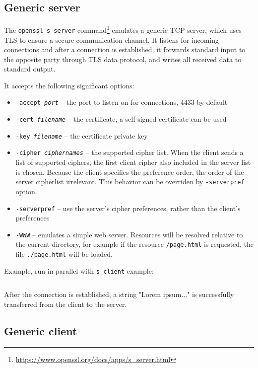 \inputminted{text}{code/openssl-speed-example.txt}


\subsection{Generic server}

The \texttt{openssl s\_server} command\footnote{\url{https://www.openssl.org/docs/apps/s\_server.html}} emulates a generic TCP server, which uses TLS to ensure a secure communication channel. It listens for incoming connections and after a connection is established, it forwards standard input to the opposite party through TLS data protocol, and writes all received data to standard output.

It accepts the following significant options:

\begin{itemize}
  \item \texttt{-accept \textit{port}} -- the port to listen on for connections, 4433 by default
  \item \texttt{-cert \textit{filename}} -- the certificate, a self-signed certificate can be used
  \item \texttt{-key \textit{filename}} -- the certificate private key
  \item \texttt{-cipher \textit{ciphernames}} -- the supported cipher list. When the client sends a list of supported ciphers, the first client cipher also included in the server list is chosen. Because the client specifies the preference order, the order of the server cipherlist irrelevant. This behavior can be overriden by \texttt{-serverpref} option.
  \item \texttt{-serverpref} -- use the server's cipher preferences, rather than the client's preferences
  \item \texttt{-WWW} -- emulates a simple web server. Resources will be resolved relative to the current directory, for example if the resource \texttt{/page.html} is requested, the file \texttt{./page.html} will be loaded.
\end{itemize}

Example, run in parallel with \texttt{s\_client} example:

\inputminted{text}{code/openssl-s_server-example.txt}

After the connection is established, a string "Lorem ipsum..." is successfully transferred from the client to the server.


\subsection{Generic client}

